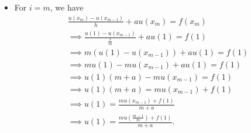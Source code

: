 \documentclass[letterpaper]{article}
\newcommand{\0}{\mathbf{0}}
\begin{document}
\begin{enumerate}
\begin{itemize}
        \item For $i = m$, we have 
        \begin{equation*}
            \begin{aligned}
                &\frac{u(x_m) - u(x_{m - 1})}{h} + au(x_m) = f(x_m) \\ 
                    &\implies \frac{u(1) - u(x_{m - 1})}{\frac{1}{m}} + au(1) = f(1) \\ 
                    &\implies m(u(1) - u(x_{m - 1})) + au(1) = f(1) \\ 
                    &\implies mu(1) - mu(x_{m - 1}) + au(1) = f(1) \\ 
                    &\implies u(1)(m + a) - mu(x_{m - 1}) = f(1) \\ 
                    &\implies u(1)(m + a) = mu(x_{m - 1}) + f(1) \\ 
                    &\implies u(1) = \frac{mu(x_{m - 1}) + f(1)}{m + a} \\ 
                    &\implies u(1) = \frac{mu(\frac{m - 1}{m}) + f(1)}{m + a}.
            \end{aligned}
        \end{equation*}
    \end{itemize}
\end{enumerate}
\end{document}
